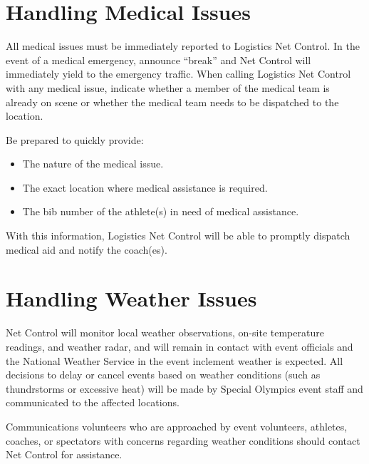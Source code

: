 \documentclass[pdflatex,letterpaper,twoside,12pt]{book}
\begin{document}

\section{Handling Medical Issues}

All medical issues must be immediately reported to Logistics Net Control.  In the event of a medical emergency, announce ``break'' and Net Control will immediately yield to the emergency traffic.  When calling Logistics Net Control with any medical issue, indicate whether a member of the medical team is already on scene or whether the medical team needs to be dispatched to the location.

Be prepared to quickly provide:

\begin{itemize}
	\item The nature of the medical issue.
	\item The exact location where medical assistance is required.
	\item The bib number of the athlete(s) in need of medical assistance.
\end{itemize}

With this information, Logistics Net Control will be able to promptly dispatch medical aid and notify the coach(es).


\section{Handling Weather Issues}

Net Control will monitor local weather observations, on-site temperature readings, and weather radar, and will remain in contact with event officials and the National Weather Service in the event inclement weather is expected.  All decisions to delay or cancel events based on weather conditions (such as thundrstorms or excessive heat) will be made by Special Olympics event staff and communicated to the affected locations.

Communications volunteers who are approached by event volunteers, athletes, coaches, or spectators with concerns regarding weather conditions should contact Net Control for assistance.
\end{document}
